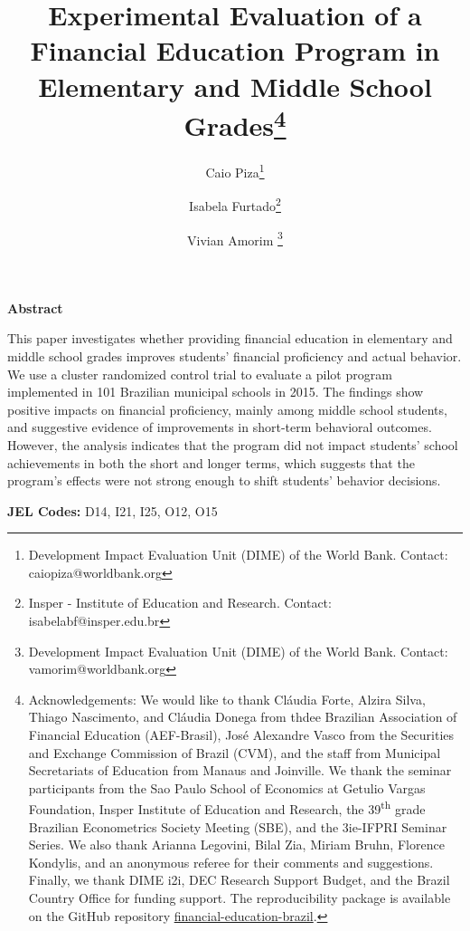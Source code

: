 \documentclass[
	article,			%
	12pt,				%
	oneside,			%
	a4paper,			%
	]{article}
\title{Experimental Evaluation of a Financial Education Program in Elementary and Middle School Grades\thanks{\scriptsize Acknowledgements: We would like to thank Cláudia Forte, Alzira Silva, Thiago Nascimento, and Cláudia Donega from thdee Brazilian Association of Financial Education (AEF-Brasil), José Alexandre Vasco from the Securities and Exchange Commission of Brazil (CVM), and the staff from Municipal Secretariats of Education from Manaus and Joinville. We thank the seminar participants from the Sao Paulo School of Economics at Getulio Vargas Foundation, Insper Institute of Education and Research, the 39\textsuperscript{th} grade  Brazilian Econometrics Society Meeting (SBE), and the 3ie-IFPRI Seminar Series. We also thank Arianna Legovini, Bilal Zia, Miriam Bruhn, Florence Kondylis, and an anonymous referee for their comments and suggestions. Finally, we thank DIME i2i, DEC Research Support Budget, and the Brazil Country Office for funding support. The reproducibility package is available on the GitHub repository \href{https://github.com/dime-worldbank/financial-education-brazil}{financial-education-brazil}.}}
\author{ Caio Piza\thanks{\scriptsize Development Impact Evaluation Unit (DIME) of the World Bank. Contact: caiopiza@worldbank.org} \and Isabela  Furtado\thanks{\scriptsize Insper - Institute of Education and Research. Contact: isabelabf@insper.edu.br} \and Vivian Amorim \thanks{\scriptsize 
 Development Impact Evaluation Unit (DIME) of the World Bank. Contact: vamorim@worldbank.org}}
\date{}
\begin{document}
\maketitle

\vspace{-100pt}
\noindent\textbf{Abstract}
\vspace{-10pt}

This paper investigates whether providing financial education in elementary and middle school grades improves students' financial proficiency and actual behavior. We use a cluster randomized control trial to evaluate a pilot program implemented in 101 Brazilian municipal schools in 2015. The findings show positive impacts on financial proficiency, mainly among middle school students, and suggestive evidence of improvements in short-term behavioral outcomes. However, the analysis indicates that the program did not impact students' school achievements in both the short and longer terms, which suggests that the program's effects were not strong enough to shift students' behavior decisions.


\vspace{-10pt}

\noindent\textbf{JEL Codes:} D14, I21, I25, O12, O15


\thispagestyle{empty}
\pagestyle{plain}

\setcounter{footnote}{0}
\renewcommand{\thefootnote}{\arabic{footnote}}
\setcounter{page}{1}


\newpage

\newpage

\newpage

\newpage

\newpage

\newpage

\newpage
\end{document}
